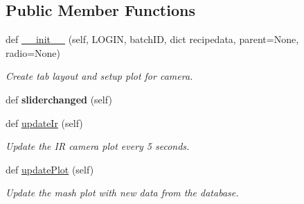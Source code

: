 \subsection*{Public Member Functions}
\begin{DoxyCompactItemize}
\item 
\mbox{\label{classboil_mash_monitor_1_1_tab_mash_aa1e5fdb0e28ecc1aea9e6a01414a6055}} 
def \mbox{\hyperlink{classboil_mash_monitor_1_1_tab_mash_aa1e5fdb0e28ecc1aea9e6a01414a6055}{\+\_\+\+\_\+init\+\_\+\+\_\+}} (self, L\+O\+G\+IN, batch\+ID, dict recipedata, parent=None, radio=None)
\begin{DoxyCompactList}\small\item\em Create tab layout and setup plot for camera. \end{DoxyCompactList}\item 
\mbox{\label{classboil_mash_monitor_1_1_tab_mash_a720e6029ab8511f2d83e4be4c5058e69}} 
def {\bfseries sliderchanged} (self)
\item 
\mbox{\label{classboil_mash_monitor_1_1_tab_mash_a99975f7e37d176c1988efa2dcd4f8e3b}} 
def \mbox{\hyperlink{classboil_mash_monitor_1_1_tab_mash_a99975f7e37d176c1988efa2dcd4f8e3b}{update\+Ir}} (self)
\begin{DoxyCompactList}\small\item\em Update the IR camera plot every 5 seconds. \end{DoxyCompactList}\item 
\mbox{\label{classboil_mash_monitor_1_1_tab_mash_a7f3e133598713ba7b632d0b53260f734}} 
def \mbox{\hyperlink{classboil_mash_monitor_1_1_tab_mash_a7f3e133598713ba7b632d0b53260f734}{update\+Plot}} (self)
\begin{DoxyCompactList}\small\item\em Update the mash plot with new data from the database. \end{DoxyCompactList}\end{DoxyCompactItemize}
